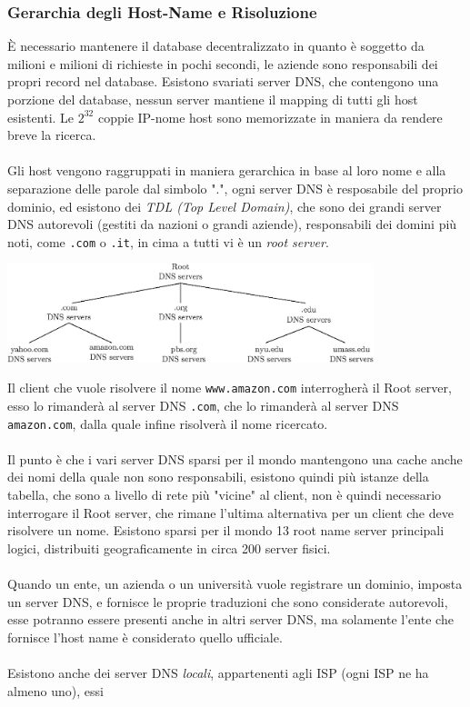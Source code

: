 \documentclass[12pt, letterpaper]{article}
\newcommand{\code}[1]{\colorbox{light-gray}{\texttt{#1}}}
\newcommand{\acc}{\\\hphantom{}\\}
\begin{document}
\subsubsection{Gerarchia degli Host-Name e Risoluzione}
È necessario mantenere il database decentralizzato in quanto è soggetto da milioni e milioni di richieste in pochi
secondi, le aziende sono responsabili dei propri record nel database. Esistono svariati server DNS, che contengono una
porzione del database, nessun server mantiene il mapping di tutti gli host esistenti. Le $2^{32}$ coppie
IP-nome host sono memorizzate in maniera da rendere breve la ricerca. \acc
Gli host vengono raggruppati in maniera gerarchica in base al loro nome e alla separazione delle parole
dal simbolo ".", ogni server DNS è resposabile del proprio dominio, ed esistono dei \textit{TDL (Top Level Domain)},
che sono dei grandi server DNS autorevoli (gestiti da nazioni o grandi aziende), responsabili dei domini più noti, come \code{.com} o \code{.it}, in
cima a tutti vi è un \textit{root server}.\begin{center}
    \includegraphics[width=0.8\textwidth ]{images/DNS.eps}
\end{center}
Il client che vuole risolvere il nome \code{www.amazon.com} interrogherà il Root server, esso
lo rimanderà al server DNS \code{.com}, che lo rimanderà al server DNS \code{amazon.com}, dalla quale infine
risolverà il nome ricercato.\acc
Il punto è che i vari server DNS sparsi per il mondo mantengono una cache anche dei nomi della quale non sono
responsabili, esistono quindi più istanze della tabella, che sono a livello di rete più "vicine" al client, non è
quindi necessario interrogare il Root server, che rimane l'ultima alternativa per un client che deve
risolvere un nome. Esistono sparsi per il mondo 13 root name server principali logici, distribuiti
geograficamente in circa 200 server fisici.\acc
Quando un ente, un azienda o un università vuole registrare un dominio, imposta un server DNS, e fornisce
le proprie traduzioni che sono considerate autorevoli, esse potranno essere presenti anche in altri server
DNS, ma solamente l'ente che fornisce l'host name è considerato quello ufficiale.\acc
Esistono anche dei server DNS \textit{locali}, appartenenti agli ISP (ogni ISP ne ha almeno uno), essi
\end{document}

